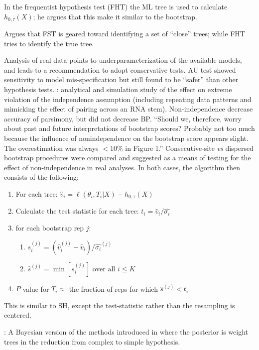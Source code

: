 \documentclass[11pt]{article}
\newcommand{\sdLL}[1]{\hat{\sigma_{#1}}}
\newcommand{\sdLLBoot}[2]{\hat{\sigma_{#1}}^{(#2)}}
\newcommand{\like}{\ell}
\newcommand{\pvalue}{$P$-value\xspace}
\begin{document}
In the frequentist hypothesis test (FHT) the ML tree is used to calculate $h_{0,\tau}(X)$; he argues that this make it similar to the bootstrap.

Argues that FST is geared toward identifying a set of ``close'' trees; while FHT tries to identify the true tree.

Analysis of real data points to underparameterization of the available models, and leads to a recommendation to adopt conservative tests.
AU test showed sensitivity to model mis-specification but still found to be ``safer'' than other hypothesis tests.
\citet{Galtier2004}: analytical and simulation study of the effect on extreme violation of the independence assumption (including repeating data patterns and mimicking the effect of pairing across an RNA stem).  Non-independence decrease accuracy of parsimony, but did not decrease BP.  ``Should we, therefore, worry about past and future interpretations of bootstrap scores? Probably not too much because the influence of nonindependence on the bootstrap score appears slight. The overestimation was always $<10\%$ in Figure 1.''  Consecutive-site {\em vs} dispersed bootstrap procedures were compared and suggested as a means of testing for the effect of non-independence in real analyses.
In both cases, the algorithm then consists of the following:
\begin{enumerate}
	\item For each tree: $\hat{v}_i = \like(\theta_i,T_i|X) - h_{0,\tau}(X)$
	\item Calculate the test statistic for each tree: $t_i = \hat{v}_i/\sdLL{i}$
	\item for each bootstrap rep $j$:
	\begin{enumerate}
		\item $s_i^{(j)} = \left(\hat{v}_i^{(j)} - \hat{v}_i \right)/\sdLLBoot{i}{j}$
		\item $\hat{s}^{(j)} = \min\left[{s_i^{(j)}}\right] \mbox{ over all } i\leq K$
	\end{enumerate}
	\item \pvalue for $T_i\approx$ the fraction of reps for which $\hat{s}^{(j)} < t_i$
\end{enumerate}

This is similar to SH, except the test-statistic rather than the resampling is centered.

\citet{ArisBrosou2003b}: A Bayesian version of the methods introduced in \citet{ArisBrosou2003} where the posterior is weight trees in the reduction from complex  to simple hypothesis.
\end{document}
